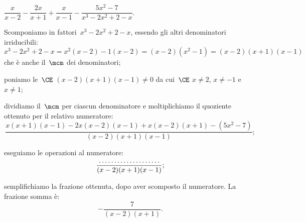 \begin{exrig}
 \begin{esempio}
$\dfrac{x}{x-2}-\dfrac{2x}{x+1}+\dfrac{x}{x-1}-\dfrac{5x^{2}-7}{x^{3}-2x^{2}+2-x}$.
\begin{itemize*}
 \item Scomponiamo in fattori~$x^{3}-2x^{2}+2-x$, essendo gli altri denominatori
 irriducibili:  $x^{3}-2x^{2}+2-x=x^2(x-2)-1(x-2)=(x-2)\left(x^2-1\right)=(x-2)(x+1)(x-1)$ che è anche il~$\mcm$ dei denominatori;
 \item poniamo le~$\CE$ $(x-2)(x+1)(x-1) \neq 0$ da cui~$\CE$ $x \neq 2$, $ x \neq -1$ e~$x \neq 1$;
 \item dividiamo il~$\mcm$ per ciascun denominatore e moltiplichiamo il quoziente ottenuto per il relativo numeratore:
 \[\frac{x(x+1)(x-1)-2x(x-2)(x-1)+x(x-2)(x+1)-(5x^{2}-7)}{(x-2)(x+1)(x-1)};\]
 \item eseguiamo le operazioni al numeratore:
 \[\frac{\dotfill}{(x-2)(x+1)(x-1)};\]
 \item semplifichiamo la frazione ottenuta, dopo aver scomposto il numeratore. La frazione somma è:
 \[-{\frac{7}{(x-2)(x+1)}}.\]
 \end{itemize*}
 \end{esempio}

\end{exrig}

\ovalbox{\risolvii \ref{ese:14.22}, \ref{ese:14.23}, \ref{ese:14.24}, \ref{ese:14.25}, \ref{ese:14.26}, \ref{ese:14.27}, \ref{ese:14.28}, \ref{ese:14.29}, \ref{ese:14.30}, \ref{ese:14.31}}
\newpage


\cleardoublepage
